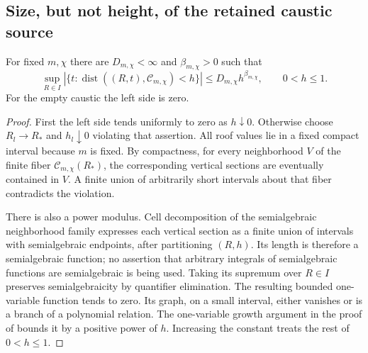 \subsection{Size, but not height, of the retained caustic source}
\begin{lemma}
\label{lem:v62-caustic-tube}
For fixed $m,\chi$ there are $D_{m,\chi}<\infty$ and
$\beta_{m,\chi}>0$ such that
\begin{equation}\label{eq:v62-caustic-tube}
 \sup_{R\in I}|\{t:\operatorname{dist}((R,t),\mathcal C_{m,\chi})<h\}|
       \le D_{m,\chi}h^{\beta_{m,\chi}},\qquad 0<h\le1.
\end{equation}
For the empty caustic the left side is zero.
\end{lemma}
\begin{proof}
First the left side tends uniformly to zero as $h\downarrow0$.
Otherwise choose $R_l\to R_*$ and $h_l\downarrow0$ violating that
assertion. All roof values lie in a fixed compact interval because
$m$ is fixed. By compactness, for every neighborhood $V$ of the finite
fiber $\mathcal C_{m,\chi}(R_*)$, the corresponding vertical sections
are eventually contained in $V$. A finite union of arbitrarily short
intervals about that fiber contradicts the violation.

There is also a power modulus. Cell decomposition of the
semialgebraic neighborhood family expresses each vertical section as
a finite union of intervals with semialgebraic endpoints, after
partitioning $(R,h)$. Its length is therefore a semialgebraic function;
no assertion that arbitrary integrals of semialgebraic functions are
semialgebraic is being used. Taking its supremum over $R\in I$
preserves semialgebraicity by quantifier elimination. The resulting
bounded one-variable function tends to zero. Its graph, on a small
interval, either vanishes or is a branch of a polynomial relation.
The one-variable growth argument in the proof of
\cite[Theorem 2.12]{CosteSAG} bounds it by a positive power of $h$.
Increasing the constant treats the rest of $0<h\le1$.
\end{proof}

